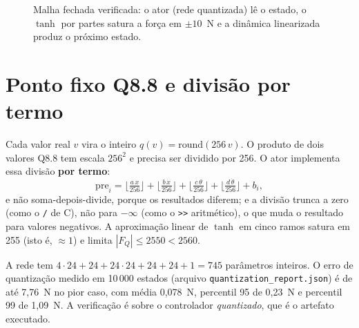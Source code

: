 \documentclass[12pt,openright,oneside,a4paper,chapter=TITLE,sumario=tradicional,english,brazil]{abntex2}
\begin{document}
\begin{figure}[htb]
  \caption{Malha fechada verificada: o ator (rede quantizada) lê o estado, o $\tanh$ por partes satura a força em $\pm10$~N e a dinâmica linearizada produz o próximo estado.}\label{fig:malha}
  \centering
\end{figure}

\section{Ponto fixo Q8.8 e divisão por termo}\label{sec:q88}

Cada valor real $v$ vira o inteiro $q(v)=\mathrm{round}(256\,v)$. O produto de dois valores Q8.8 tem escala $256^2$ e precisa ser dividido por 256. O ator implementa essa divisão \textbf{por termo}:
\[
  \mathrm{pre}_i = \Big\lfloor\tfrac{a\,x}{256}\Big\rfloor+\Big\lfloor\tfrac{b\,\dot x}{256}\Big\rfloor+\Big\lfloor\tfrac{c\,\theta}{256}\Big\rfloor+\Big\lfloor\tfrac{d\,\dot\theta}{256}\Big\rfloor+b_i,
\]
e não soma-depois-divide, porque os resultados diferem; e a divisão trunca a zero (como o \texttt{/} de C), não para $-\infty$ (como o \texttt{>>} aritmético), o que muda o resultado para valores negativos. A aproximação linear de $\tanh$ em cinco ramos satura em 255 (isto é, $\approx 1$) e limita $|F_Q|\le2550<2560$.

A rede tem $4{\cdot}24+24+24{\cdot}24+24+24+1=745$ parâmetros inteiros. O erro de quantização medido em 10\,000 estados (arquivo \texttt{quantization\_report.json}) é de até 7,76~N no pior caso, com média 0,078~N, percentil 95 de 0,23~N e percentil 99 de 1,09~N. A verificação é sobre o controlador \emph{quantizado}, que é o artefato executado.
\end{document}

